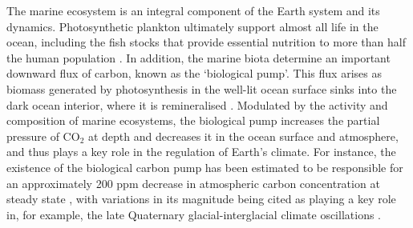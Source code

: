 \documentclass[gmd, manuscript]{copernicus}
\begin{document}
The marine ecosystem is an integral component of the Earth system and its dynamics. Photosynthetic plankton ultimately support almost all life in the ocean, including the fish stocks that provide essential nutrition to more than half the human population \citep{Hollowed:2013}. In addition, the marine biota determine an important downward flux of carbon, known as the `biological pump'. This flux arises as biomass generated by photosynthesis in the well-lit ocean surface sinks into the dark ocean interior, where it is remineralised \citep[e.g.][]{Hulse:2017}. Modulated by the activity and composition of marine ecosystems, the biological pump increases the partial pressure of CO$_2$ at depth and decreases it in the ocean surface and atmosphere, and thus plays a key role in the regulation of Earth's climate. For instance, the existence of the biological carbon pump has been estimated to be responsible for an approximately 200 ppm decrease in atmospheric carbon concentration at steady state \citep{Parekh:2006}, with variations in its magnitude being cited as playing a key role in, for example, the late Quaternary glacial-interglacial climate oscillations \citep{Watson:2000,Hain:2014}.
\end{document}
